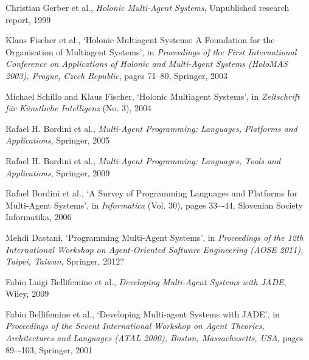 \begin{thebibliography}{99}
Christian Gerber et al., %
\textit{Holonic Multi-Agent Systems},
Unpublished research report, 1999

Klaus Fischer et al., %
`Holonic Multiagent Systems: A Foundation for the Organisation of Multiagent Systems',
in \textit{Proceedings of the First International Conference on Applications of Holonic and Multi-Agent Systems (HoloMAS 2003), Prague, Czech Republic},
pages 71--80,
Springer, 2003

Michael Schillo and Klaus Fischer,
`Holonic Multiagent Systems',
in \textit{Zeitschrift für Künstliche Intelligenz} (No. 3),
2004


Rafael H. Bordini et al., %
\textit{Multi-Agent Programming: Languages, Platforms and Applications},
Springer, 2005

Rafael H. Bordini et al., %
\textit{Multi-Agent Programming: Languages, Tools and Applications},
Springer, 2009

Rafael Bordini et al.,
`A Survey of Programming Languages and Platforms for Multi-Agent Systems',
in \textit{Informatica} (Vol. 30),
pages 33–-44,
Slovenian Society Informatika, 2006

Mehdi Dastani,
`Programming Multi-Agent Systems',
in \textit{Proceedings of the 12th International Workshop on Agent-Oriented Software Engineering (AOSE 2011), Taipei, Taiwan},
Springer, 2012?


Fabio Luigi Bellifemine et al., %
\textit{Developing Multi-Agent Systems with JADE},
Wiley, 2009

Fabio Bellifemine et al., %
`Developing Multi-agent Systems with JADE',
in \textit{Proceedings of the Sevent International Workshop on Agent Theories, Architectures and Languages (ATAL 2000), Boston, Massachusetts, USA},
pages 89–-103,
Springer, 2001


\end{thebibliography}

